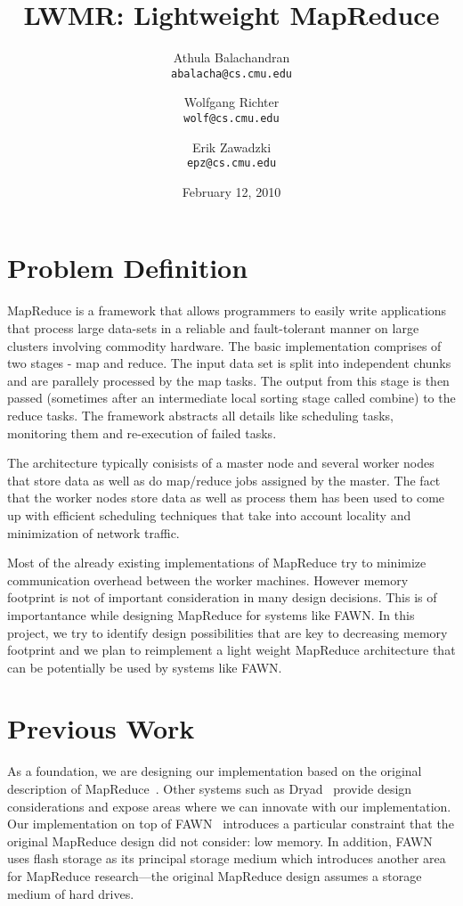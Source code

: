 \documentclass[10pt,letter,final,article,twocolumn]{article} %
\title{LWMR: Lightweight MapReduce}
\author{Athula Balachandran \\
{\tt abalacha@cs.cmu.edu}
\and
Wolfgang Richter \\
{\tt wolf@cs.cmu.edu}
\and
Erik Zawadzki \\
{\tt epz@cs.cmu.edu}}
\date{February 12, 2010} %
\begin{document}
\pagestyle{empty}
\maketitle
\thispagestyle{empty}

\section{Problem Definition}
MapReduce is a framework that allows programmers to easily write applications that process large data-sets in a reliable and fault-tolerant manner on large clusters involving commodity hardware. The basic implementation  comprises of two stages - map and reduce. The input data set is split into independent chunks and are parallely processed by the map tasks. The output from this stage is then passed (sometimes after an intermediate local sorting stage called combine) to the reduce tasks. The framework abstracts all details like scheduling tasks, monitoring them and re-execution of failed tasks. 

The architecture typically conisists of a master node and several worker nodes that store data as well as do map/reduce jobs assigned by the master. The fact that the worker nodes store data as well as process them has been used to come up with efficient scheduling techniques that take into account locality and minimization of network traffic.

Most of the already existing implementations of MapReduce try to minimize communication overhead between the worker machines. However memory footprint is not of important consideration in many design decisions. This is of importantance while designing MapReduce for systems like FAWN. In this project, we try to identify design possibilities that are key to decreasing memory footprint and we plan to reimplement a light weight MapReduce architecture that can be potentially be used by systems like FAWN.


\section{Previous Work}

As a foundation, we are designing our implementation based on the original 
description of MapReduce~\cite{mapreduce08}.  Other systems such as
Dryad~\cite{dryad07} provide design considerations and expose areas
where we can innovate with our implementation.  Our implementation on top
of FAWN~\cite{fawn09} introduces a particular constraint that the original
MapReduce design did not consider: low memory.  In addition, FAWN uses
flash storage as its principal storage medium which introduces another
area for MapReduce research---the original MapReduce design assumes a
storage medium of hard drives.  
\end{document}
